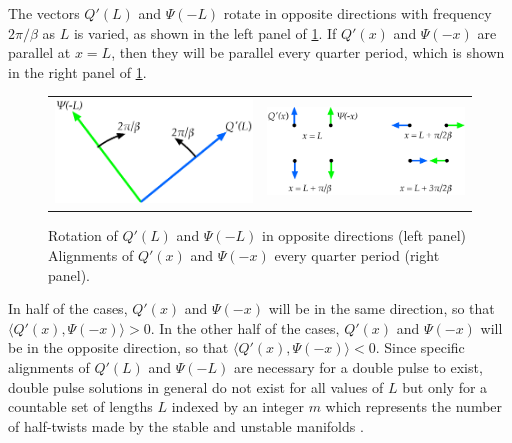 \documentclass[thesis2.tex]{subfiles}
\begin{document}
The vectors $Q'(L)$ and $\Psi(-L)$ rotate in opposite directions with frequency $2 \pi/\beta$ as $L$ is varied, as shown in the left panel of \cref{fig:psiqrotate}. If $Q'(x)$ and $\Psi(-x)$ are parallel at $x = L$, then they will be parallel every quarter period, which is shown in the right panel of \cref{fig:psiqrotate}.
\begin{figure}
\begin{center}
\begin{tabular}{cc}
\includegraphics[width=8cm]{images/intro/psiqrotate} &
\includegraphics[width=8cm]{images/intro/psiqoneperiod}
\end{tabular}
\caption[Alignment of vectors necessary for a double pulse]{Rotation of $Q'(L)$ and $\Psi(-L)$ in opposite directions (left panel) Alignments of $Q'(x)$ and $\Psi(-x)$ every quarter period (right panel).}
\label{fig:psiqrotate}
\end{center}
\end{figure}
In half of the cases, $Q'(x)$ and $\Psi(-x)$ will be in the same direction, so that $\langle Q'(x), \Psi(-x) \rangle > 0$. In the other half of the cases, $Q'(x)$ and $\Psi(-x)$ will be in the opposite direction, so that $\langle Q'(x), \Psi(-x) \rangle < 0$. Since specific alignments of $Q'(L)$ and $\Psi(-L)$ are necessary for a double pulse to exist, double pulse solutions in general do not exist for all values of $L$ but only for a countable set of lengths $L$ indexed by an integer $m$ which represents the number of half-twists made by the stable and unstable manifolds \cite{SandstedeStrut}.  
\end{document}
